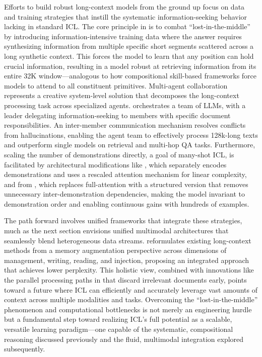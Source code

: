 \documentclass[11pt]{article}
\begin{document}
Efforts to build robust long-context models from the ground up focus on data and training strategies that instill the systematic information-seeking behavior lacking in standard ICL. The core principle in \cite{ref634} is to combat ``lost-in-the-middle'' by introducing information-intensive training data where the answer requires synthesizing information from multiple specific short segments scattered across a long synthetic context. This forces the model to learn that any position can hold crucial information, resulting in a model robust at retrieving information from its entire 32K window---analogous to how compositional skill-based frameworks force models to attend to all constituent primitives. Multi-agent collaboration represents a creative system-level solution that decomposes the long-context processing task across specialized agents. \cite{ref635} orchestrates a team of LLMs, with a leader delegating information-seeking to members with specific document responsibilities. An inter-member communication mechanism resolves conflicts from hallucinations, enabling the agent team to effectively process 128k-long texts and outperform single models on retrieval and multi-hop QA tasks. Furthermore, scaling the number of demonstrations directly, a goal of many-shot ICL, is facilitated by architectural modifications like \cite{ref208}, which separately encodes demonstrations and uses a rescaled attention mechanism for linear complexity, and \cite{ref636} from \cite{ref637}, which replaces full-attention with a structured version that removes unnecessary inter-demonstration dependencies, making the model invariant to demonstration order and enabling continuous gains with hundreds of examples.

The path forward involves unified frameworks that integrate these strategies, much as the next section envisions unified multimodal architectures that seamlessly blend heterogeneous data streams. \cite{ref638} reformulates existing long-context methods from a memory augmentation perspective across dimensions of management, writing, reading, and injection, proposing an integrated approach that achieves lower perplexity. This holistic view, combined with innovations like the parallel processing paths in \cite{ref639} that discard irrelevant documents early, points toward a future where ICL can efficiently and accurately leverage vast amounts of context across multiple modalities and tasks. Overcoming the ``lost-in-the-middle'' phenomenon and computational bottlenecks is not merely an engineering hurdle but a fundamental step toward realizing ICL's full potential as a scalable, versatile learning paradigm---one capable of the systematic, compositional reasoning discussed previously and the fluid, multimodal integration explored subsequently.
\end{document}

